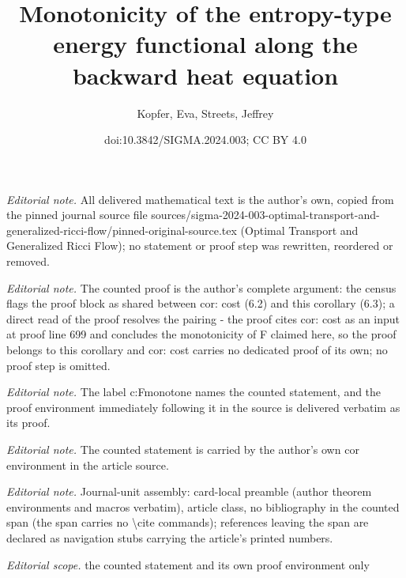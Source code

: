 \documentclass[10pt,a4paper]{article}
\title{Monotonicity of the entropy-type energy functional along the backward heat equation}
\author{Kopfer, Eva, Streets, Jeffrey}
\date{doi:10.3842/SIGMA.2024.003; CC BY 4.0}
\numberwithin{equation}{section}
\begin{document}
\maketitle
\setcounter{section}{4}
\setcounter{thm}{6}
\noindent\textit{Editorial note.} All delivered mathematical text is the author's own, copied from the pinned journal source file sources/sigma-2024-003-optimal-transport-and-generalized-ricci-flow/pinned-original-source.tex (Optimal Transport and Generalized Ricci Flow); no statement or proof step was rewritten, reordered or removed.\par\medskip
\noindent\textit{Editorial note.} The counted proof is the author's complete argument: the census flags the proof block as shared between cor: cost (6.2) and this corollary (6.3); a direct read of the proof resolves the pairing - the proof cites cor: cost as an input at proof line 699 and concludes the monotonicity of F claimed here, so the proof belongs to this corollary and cor: cost carries no dedicated proof of its own; no proof step is omitted.\par\medskip
\noindent\textit{Editorial note.} The label c:Fmonotone names the counted statement, and the proof environment immediately following it in the source is delivered verbatim as its proof.\par\medskip
\noindent\textit{Editorial note.} The counted statement is carried by the author's own cor environment in the article source.\par\medskip
\noindent\textit{Editorial note.} Journal-unit assembly: card-local preamble (author theorem environments and macros verbatim), article class, no bibliography in the counted span (the span carries no \textbackslash{}cite commands); references leaving the span are declared as navigation stubs carrying the article's printed numbers.\par\medskip
\noindent\textit{Editorial scope.} the counted statement and its own proof environment only\par\medskip
\end{document}
